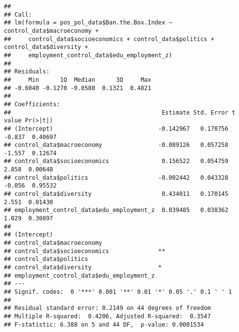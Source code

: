 \documentclass[
]{article}
\newenvironment{Shaded}{\begin{snugshade}}{\end{snugshade}}
\newcommand{\CommentTok}[1]{\textcolor[rgb]{0.56,0.35,0.01}{\textit{#1}}}
\newcommand{\FunctionTok}[1]{\textcolor[rgb]{0.13,0.29,0.53}{\textbf{#1}}}
\newcommand{\NormalTok}[1]{#1}
\newcommand{\OtherTok}[1]{\textcolor[rgb]{0.56,0.35,0.01}{#1}}
\newcommand{\SpecialCharTok}[1]{\textcolor[rgb]{0.81,0.36,0.00}{\textbf{#1}}}
\begin{document}
\begin{Shaded}
\end{Shaded}

\begin{verbatim}
## 
## Call:
## lm(formula = pos_pol_data$Ban.the.Box.Index ~ control_data$macroeconomy + 
##     control_data$socioeconomics + control_data$politics + control_data$diversity + 
##     employment_control_data$edu_employment_z)
## 
## Residuals:
##     Min      1Q  Median      3Q     Max 
## -0.6040 -0.1270 -0.0580  0.1321  0.4821 
## 
## Coefficients:
##                                           Estimate Std. Error t value Pr(>|t|)
## (Intercept)                              -0.142967   0.170756  -0.837  0.40697
## control_data$macroeconomy                -0.089126   0.057258  -1.557  0.12674
## control_data$socioeconomics               0.156522   0.054759   2.858  0.00648
## control_data$politics                    -0.002442   0.043328  -0.056  0.95532
## control_data$diversity                    0.434011   0.170145   2.551  0.01430
## employment_control_data$edu_employment_z  0.039485   0.038362   1.029  0.30897
##                                            
## (Intercept)                                
## control_data$macroeconomy                  
## control_data$socioeconomics              **
## control_data$politics                      
## control_data$diversity                   * 
## employment_control_data$edu_employment_z   
## ---
## Signif. codes:  0 '***' 0.001 '**' 0.01 '*' 0.05 '.' 0.1 ' ' 1
## 
## Residual standard error: 0.2149 on 44 degrees of freedom
## Multiple R-squared:  0.4206, Adjusted R-squared:  0.3547 
## F-statistic: 6.388 on 5 and 44 DF,  p-value: 0.0001534
\end{verbatim}
\end{document}

